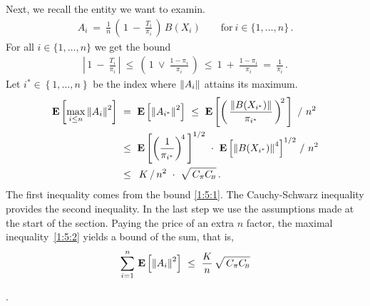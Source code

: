 Next, we recall the entity we want to examin.
\begin{gather*}
  A_i
  \ 
  =
  \ 
  \frac{1}{n}
  \,
  \left( 
    \,
    1
    \ 
    -
    \ 
    \frac{T_i}{\pi_i}
    \,
  \right)
  \,
  B(X_i)
  \qquad
  \text{for}
  \ 
  i\in \{1, \ldots, n\}\,.
\end{gather*}
For all
$
  i\in \{1, \ldots, n\}
$
we get the bound
\begin{gather}
  \label{1:5:1}
  \left| 
    \,
    1
    \ 
    -
    \ 
    \frac{T_i}{\pi_i}
    \,
  \right|
  \ 
  \le
  \ 
  \left( 
    \,
  1
  \ 
  \lor
  \ 
  \frac{1-\pi_i}{\pi_i}
  \,
  \right)
  \ 
  \le
  \ 
  1
  \ 
  +
  \ 
  \frac{1-\pi_i}{\pi_i}
  \ 
  =
  \ 
  \frac{1}{\pi_i}
  \,.
\end{gather}
Let
$i^*\in \left\{ 1, \ldots, n \right\}$
be the index where 
$
\left\lVert A_i\right\rVert
$
attains its maximum.
\begin{align}
  \label{1:5:2}
  \begin{split}
  \E\left[\max_{i \le n}\norm{A_i}^2\right]
  &
  \ 
  =
  \ 
  \E\left[\norm{A_{i^*}}^2\right]
  \ 
  \le
  \ 
  \E \left[ 
    \left(
      \,
      \frac{
    \norm{B(X_{i^*})}
      }{\pi_{i^*}}
      \,
    \right)
    ^{\!2}
    \,
  \right]
  \ 
  /
  \ 
  n^2
  \\
  &
    \ 
  \le
  \ 
  \E \left[ 
    \left(
      \frac{1}{\pi_{i^*}}
    \right)^{\!4}
    \,
  \right]^{1/2}
  \ 
  \cdot
  \ 
  \E\left[
    \norm{B(X_{i^*})}^4
  \right]^{1/2}
  \,
  /
  \ 
  n^2
  \\
  &
  \ 
  \le
  \ 
  \,
  K
  \,
  /
  \,
  n^2
  \ 
  \cdot
  \ 
  \sqrt{
    \,
    C_\pi
    C_{\!\scriptscriptstyle B}
  }
  \,.
\end{split}
\end{align}
The first inequality comes from the bound \eqref{1:5:1}.
The Cauchy-Schwarz inequality provides the second inequality.
In the last step we use the assumptions made at the start of the section. 
Paying the price of an extra $n$ factor, the 
maximal inequality~\eqref{1:5:2}
yields a bound of the sum, that is,
\begin{gather*}
  \sum_{i=1}^{n}
  \,
  \E\left[\norm{A_i}^2\right]
  \ 
  \le
  \ 
  \frac{K}{n}
  \,
  \sqrt{\,C_\pi 
    C_{\!\scriptscriptstyle B}
  }
\end{gather*}
\begin{assumption}
  .
\end{assumption}
 

